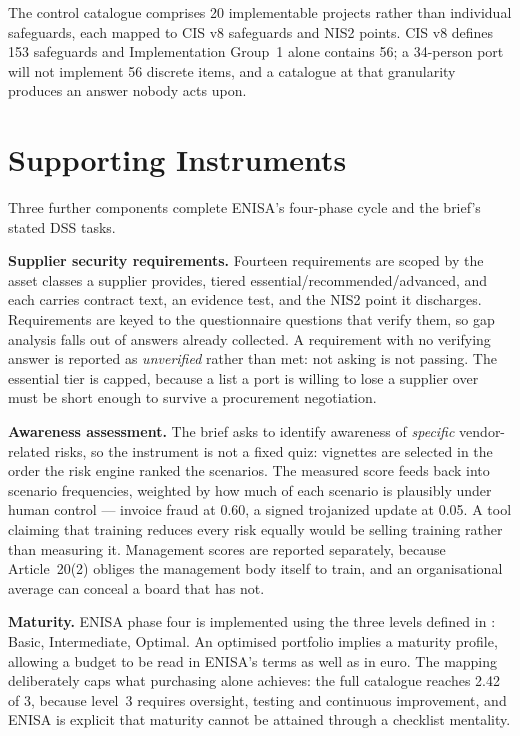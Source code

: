 \documentclass[conference]{IEEEtran}
\begin{document}
The control catalogue comprises 20 implementable projects rather than individual
safeguards, each mapped to CIS v8 safeguards and NIS2 points. CIS v8 defines 153
safeguards and Implementation Group~1 alone contains 56; a 34-person port will not
implement 56 discrete items, and a catalogue at that granularity produces an answer
nobody acts upon.

\section{Supporting Instruments}

Three further components complete ENISA's four-phase cycle and the brief's stated
DSS tasks.

\textbf{Supplier security requirements.} Fourteen requirements are scoped by the
asset classes a supplier provides, tiered essential/recommended/advanced, and each
carries contract text, an evidence test, and the NIS2 point it discharges.
Requirements are keyed to the questionnaire questions that verify them, so gap
analysis falls out of answers already collected. A requirement with no verifying
answer is reported as \emph{unverified} rather than met: not asking is not passing.
The essential tier is capped, because a list a port is willing to lose a supplier
over must be short enough to survive a procurement negotiation.

\textbf{Awareness assessment.} The brief asks to identify awareness of
\emph{specific} vendor-related risks, so the instrument is not a fixed quiz:
vignettes are selected in the order the risk engine ranked the scenarios. The
measured score feeds back into scenario frequencies, weighted by how much of each
scenario is plausibly under human control --- invoice fraud at 0.60, a signed
trojanized update at 0.05. A tool claiming that training reduces every risk equally
would be selling training rather than measuring it. Management scores are reported
separately, because Article~20(2) obliges the management body itself to train, and
an organisational average can conceal a board that has not.

\textbf{Maturity.} ENISA phase four is implemented using the three levels defined in
\cite{enisa2020}: Basic, Intermediate, Optimal. An optimised portfolio implies a
maturity profile, allowing a budget to be read in ENISA's terms as well as in euro.
The mapping deliberately caps what purchasing alone achieves: the full catalogue
reaches 2.42 of 3, because level~3 requires oversight, testing and continuous
improvement, and ENISA is explicit that maturity cannot be attained through a
checklist mentality.
\end{document}
